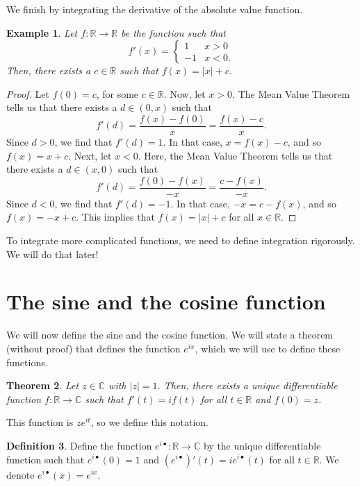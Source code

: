 \documentclass[a4paper, openany]{memoir}
\theoremstyle{definition}
\newtheorem{definition}{Definition}[section]
\theoremstyle{plain}
\newtheorem{theorem}[definition]{Theorem}
\newtheorem{example}[definition]{Example}
\begin{document}
We finish by integrating the derivative of the absolute value function.
\begin{example}
Let $f: \mathbb{R} \to \mathbb{R}$ be the function such that
\[f'(x) = \begin{cases}
1 & x > 0 \\
-1 & x < 0.
\end{cases}\]
Then, there exists a $c \in \mathbb{R}$ such that $f(x) = |x| + c$.
\end{example}
\begin{proof}
Let $f(0) = c$, for some $c \in \mathbb{R}$. Now, let $x > 0$. The Mean Value Theorem tells us that there exists a $d \in (0, x)$ such that
\[f'(d) = \frac{f(x) - f(0)}{x} = \frac{f(x) - c}{x}.\]
Since $d > 0$, we find that $f'(d) = 1$. In that case, $x = f(x) - c$, and so $f(x) = x + c$. Next, let $x < 0$. Here, the Mean Value Theorem tells us that there exists a $d \in (x, 0)$ such that
\[f'(d) = \frac{f(0) - f(x)}{-x} = \frac{c - f(x)}{-x}.\]
Since $d < 0$, we find that $f'(d) = -1$. In that case, $-x = c - f(x)$, and so $f(x) = -x + c$. This implies that $f(x) = |x| + c$ for all $x \in \mathbb{R}$.
\end{proof}
\noindent To integrate more complicated functions, we need to define integration rigorously. We will do that later!

\newpage

\section{The sine and the cosine function}
We will now define the sine and the cosine function. We will state a theorem (without proof) that defines the function $e^{ix}$, which we will use to define these functions.
\begin{theorem}
Let $z \in \mathbb{C}$ with $|z| = 1$. Then, there exists a unique differentiable function $f: \mathbb{R} \to \mathbb{C}$ such that $f'(t) = if(t)$ for all $t \in \mathbb{R}$ and $f(0) = z$.
\end{theorem}
\noindent This function is $ze^{it}$, so we define this notation.
\begin{definition}
Define the function $e^{i\bullet}: \mathbb{R} \to \mathbb{C}$ by the unique differentiable function such that $e^{i \bullet}(0) = 1$ and $(e^{i \bullet})'(t) = i e^{i \bullet}(t)$ for all $t \in \mathbb{R}$. We denote $e^{i \bullet} (x) = e^{ix}$.
\end{definition}
\end{document}
